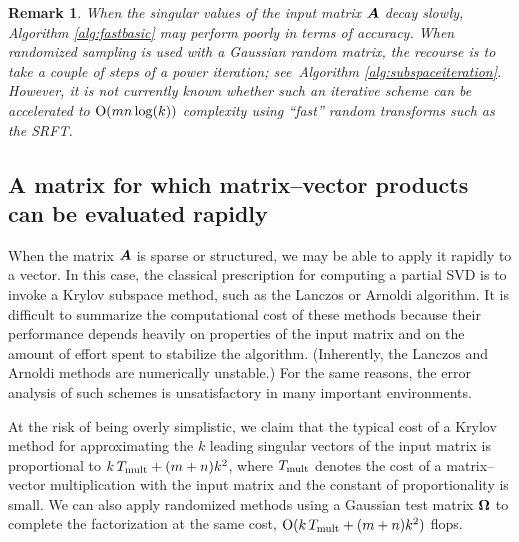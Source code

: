 \documentclass{article}
\newtheorem{remark}{Remark}
\begin{document}
\lsp

\begin{remark} \rm
When the singular values of the input matrix $\bm{A}$ decay slowly,
Algorithm \ref{alg:fastbasic} may perform poorly in terms of accuracy.
When randomized sampling is used with a Gaussian random matrix, the
recourse is to take a couple of steps of a power iteration;
see~Algorithm \ref{alg:subspaceiteration}. However, it is not currently
known whether such an iterative scheme can be accelerated to $\mathrm{O}(mn\log(k))$
complexity using ``fast'' random transforms such as the SRFT.
\end{remark}

\subsection{A matrix for which matrix--vector products can be evaluated rapidly}

When the matrix $\bm{A}$ is sparse or structured, we may be able to apply
it rapidly to a vector.  In this case, the classical prescription for computing
a partial SVD is to invoke a Krylov subspace method, such as the Lanczos or Arnoldi
algorithm.  It is difficult to summarize the computational cost of these methods because
their performance depends heavily on properties of the input matrix
and on the amount of effort spent to stabilize the algorithm.
(Inherently, the Lanczos and Arnoldi methods are numerically unstable.)
For the same reasons, the error analysis of such schemes is unsatisfactory
in many important environments.


At the risk of being overly simplistic, we claim that the typical
cost of a Krylov method for approximating the $k$ leading singular vectors
of the input matrix is proportional to $k \, T_{\rm mult} + (m+n) k^2$,
where $T_{\rm mult}$ denotes the cost of a matrix--vector multiplication with
the input matrix and the constant of proportionality is small.
We can also apply randomized methods using a Gaussian test matrix
$\bm{\Omega}$ to complete the factorization at the same cost,
$\mathrm{O}(k \, T_{\rm mult} + (m+n)k^2)$ flops.

\end{document}
